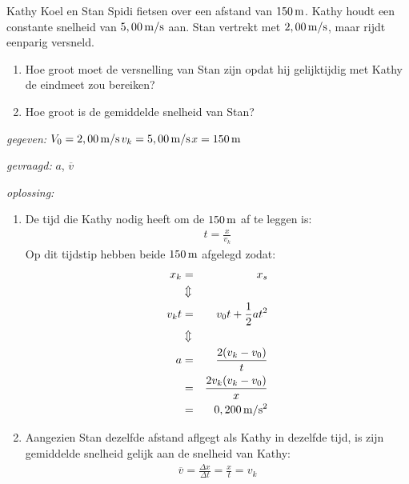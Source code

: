 \begin{exercise} Kathy Koel en Stan Spidi fietsen over een afstand van $150\rm\,m$. Kathy houdt een constante snelheid van $5,00\rm\,m/s$ aan. Stan vertrekt met $2,00\rm\,m/s$, maar rijdt eenparig versneld.
\begin{enumerate}
\item Hoe groot moet de versnelling van Stan zijn opdat hij gelijktijdig met Kathy de eindmeet zou bereiken?
\item Hoe groot is de gemiddelde snelheid van Stan?
\end{enumerate}
\begin{oplossing}
\item[\textit{gegeven:}]$V_0=2,00\rm\,m/s$\newline$v_k=5,00\rm\,m/s$\newline$x=150\rm\,m$
\item [\textit{gevraagd:}]$a$, $\overline{v}$
\item [\textit{oplossing:}]
\begin{enumerate}
\item De tijd die Kathy nodig heeft om de
$150\rm\,m$ af te leggen is:
\begin{eqnarray*}
t=\frac{x}{v_k}
\end{eqnarray*}
Op dit tijdstip hebben beide $150\rm\,m$ afgelegd zodat:
\begin{eqnarray*}
x_k&=&x_s\\
&\Updownarrow&\\
v_kt&=&v_0t+\frac{1}{2}at^2\\
&\Updownarrow&\\
a&=&\frac{2(v_k-v_0)}{t}\\
&=&\frac{2v_k(v_k-v_0)}{x}\\
&=&0,200\rm\,m/s^2
\end{eqnarray*}
\item Aangezien Stan dezelfde afstand aflgegt als Kathy in dezelfde tijd, is
zijn gemiddelde snelheid gelijk aan de snelheid van Kathy:
\begin{eqnarray*}
\overline{v}=\frac{\Delta x}{\Delta t}=\frac{x}{t}=v_k
\end{eqnarray*}
\end{enumerate}
\end{oplossing}



\end{exercise}


